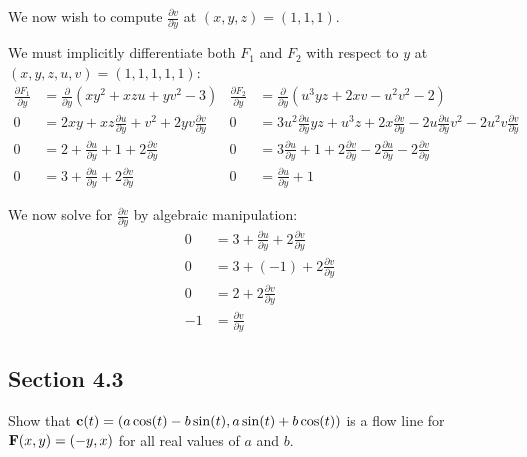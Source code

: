 \begin{solution}
We now wish to compute \(\frac{\partial v}{\partial y}\) at \((x, y, z) = (1, 1, 1)\). 

We must implicitly differentiate both \(F_1\) and \(F_2\) with respect to \(y\) at \((x, y, z, u, v) = (1,1,1,1,1)\):
\begin{align*}
    \frac{\partial F_1}{\partial y} &= \frac{\partial}{\partial y}\left(xy^2 + xzu + yv^2 - 3\right) & \frac{\partial F_2}{\partial y} &= \frac{\partial}{\partial y}\left(u^3yz + 2xv - u^2v^2 - 2\right) \\
    0 &= 2xy + xz\frac{\partial u}{\partial y} + v^2 + 2yv\frac{\partial v}{\partial y} & 0 &= 3u^2\frac{\partial u}{\partial y}yz + u^3z + 2x\frac{\partial v}{\partial y} - 2u\frac{\partial u}{\partial y}v^2 - 2u^2v \frac{\partial v}{\partial y} \\
    0 &= 2 + \frac{\partial u}{\partial y} + 1 + 2\frac{\partial v}{\partial y} & 0 &= 3\frac{\partial u}{\partial y} + 1 + 2\frac{\partial v}{\partial y} - 2\frac{\partial u}{\partial y} - 2\frac{\partial v}{\partial y} \\
    0 &= 3 + \frac{\partial u}{\partial y} + 2\frac{\partial v}{\partial y} & 0 &= \frac{\partial u}{\partial y} + 1
\end{align*}

We now solve for \(\frac{\partial v}{\partial y}\) by algebraic manipulation:
\begin{align*}
    0 &= 3 + \frac{\partial u}{\partial y} + 2\frac{\partial v}{\partial y} \\
    0 &= 3 + (-1) + 2\frac{\partial v}{\partial y} \\
    0 &= 2 + 2\frac{\partial v}{\partial y} \\
    -1 &= \frac{\partial v}{\partial y}
\end{align*}
\end{solution}

\subsection{Section 4.3}

\begin{tcolorbox}[
        title={Problem 20},
        valign=center,
        nobeforeafter,
        colframe=gray!95!black
    ]
Show that \(\vb{c}(t) = (a \cos(t) - b \sin(t) , a \sin(t) + b \cos(t))\) is a flow line for \(\vb{F}(x, y) = (-y, x)\) for all real values of \(a\) and \(b\).
\end{tcolorbox}

